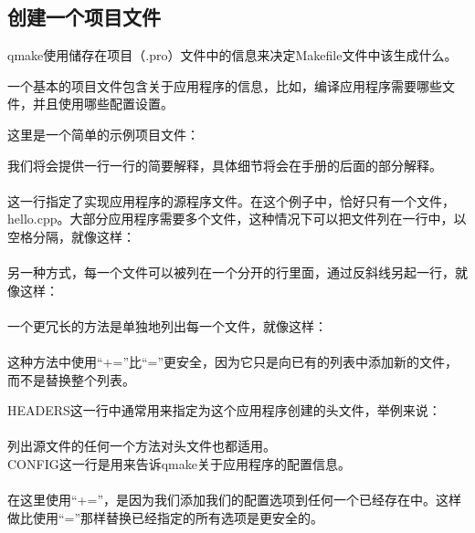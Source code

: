\subsection{创建一个项目文件}
qmake使用储存在项目（.pro）文件中的信息来决定Makefile文件中该生成什么。\par
一个基本的项目文件包含关于应用程序的信息，比如，编译应用程序需要哪些文件，并且使用哪些配置设置。\par
这里是一个简单的示例项目文件：
\begin{flushleft}
  {\color{seagreen}{
      SOURCES = hello.cpp \\
      HEADERS = hello.h \\
      CONFIG += qt warn\_on release
    }}
\end{flushleft}
我们将会提供一行一行的简要解释，具体细节将会在手册的后面的部分解释。\\
{\color{seagreen}{
    SOURCES = hello.cpp
  }}\\
这一行指定了实现应用程序的源程序文件。在这个例子中，恰好只有一个文件，hello.cpp。大部分应用程序需要多个文件，这种情况下可以把文件列在一行中，以空格分隔，就像这样：\\
{\color{seagreen}{
    SOURCES = hello.cpp main.cpp
  }}\\
另一种方式，每一个文件可以被列在一个分开的行里面，通过反斜线另起一行，就像这样：\\
{}\\
一个更冗长的方法是单独地列出每一个文件，就像这样：\\
{\color{seagreen}{
    SOURCES += hello.cpp\\
    SOURCES += main.cpp
  }}\\
这种方法中使用“+=”比“=”更安全，因为它只是向已有的列表中添加新的文件，而不是替换整个列表。\par
HEADERS这一行中通常用来指定为这个应用程序创建的头文件，举例来说：\\
{\color{seagreen}{
    HEADERS += hello.h
  }}\\
列出源文件的任何一个方法对头文件也都适用。\\
CONFIG这一行是用来告诉qmake关于应用程序的配置信息。\\
{\color{seagreen}{
    CONFIG += qt warn\_on release
  }}\\
在这里使用“+=”，是因为我们添加我们的配置选项到任何一个已经存在中。这样做比使用“=”那样替换已经指定的所有选项是更安全的。\par
